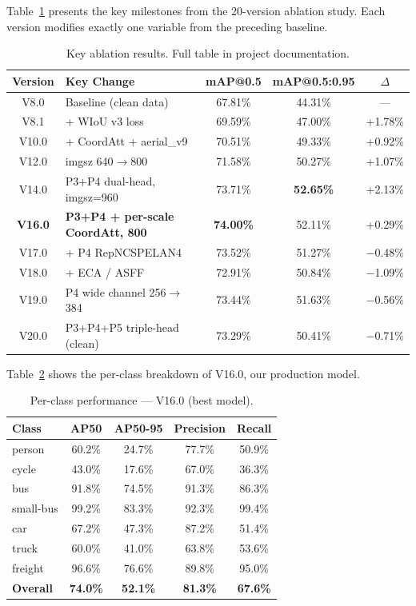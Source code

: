 \documentclass[11pt]{article}
\begin{document}
Table~\ref{tab:ablation} presents the key milestones from the 20-version ablation study. Each
version modifies exactly one variable from the preceding baseline.

\begin{table}[H]
\centering
\caption{Key ablation results. Full table in project documentation.}
\label{tab:ablation}
\begin{tabular}{clccc}
\toprule
Version & Key Change & mAP@0.5 & mAP@0.5:0.95 & $\Delta$ \\
\midrule
V8.0  & Baseline (clean data) & 67.81\% & 44.31\% & --- \\
V8.1  & + WIoU v3 loss & 69.59\% & 47.00\% & +1.78\% \\
V10.0 & + CoordAtt + aerial\_v9 & 70.51\% & 49.33\% & +0.92\% \\
V12.0 & imgsz 640$\rightarrow$800 & 71.58\% & 50.27\% & +1.07\% \\
V14.0 & P3+P4 dual-head, imgsz=960 & 73.71\% & \textbf{52.65\%} & +2.13\% \\
\textbf{V16.0} & \textbf{P3+P4 + per-scale CoordAtt, 800} & \textbf{74.00\%} & 52.11\% & +0.29\% \\
V17.0 & + P4 RepNCSPELAN4 & 73.52\% & 51.27\% & $-$0.48\% \\
V18.0 & + ECA / ASFF & 72.91\% & 50.84\% & $-$1.09\% \\
V19.0 & P4 wide channel 256$\rightarrow$384 & 73.44\% & 51.63\% & $-$0.56\% \\
V20.0 & P3+P4+P5 triple-head (clean) & 73.29\% & 50.41\% & $-$0.71\% \\
\bottomrule
\end{tabular}
\end{table}

Table~\ref{tab:perclass} shows the per-class breakdown of V16.0, our production model.

\begin{table}[H]
\centering
\caption{Per-class performance — V16.0 (best model).}
\label{tab:perclass}
\begin{tabular}{lcccc}
\toprule
Class & AP50 & AP50-95 & Precision & Recall \\
\midrule
person    & 60.2\% & 24.7\% & 77.7\% & 50.9\% \\
cycle     & 43.0\% & 17.6\% & 67.0\% & 36.3\% \\
bus       & 91.8\% & 74.5\% & 91.3\% & 86.3\% \\
small-bus & 99.2\% & 83.3\% & 92.3\% & 99.4\% \\
car       & 67.2\% & 47.3\% & 87.2\% & 51.4\% \\
truck     & 60.0\% & 41.0\% & 63.8\% & 53.6\% \\
freight   & 96.6\% & 76.6\% & 89.8\% & 95.0\% \\
\midrule
\textbf{Overall} & \textbf{74.0\%} & \textbf{52.1\%} & \textbf{81.3\%} & \textbf{67.6\%} \\
\bottomrule
\end{tabular}
\end{table}
\end{document}
